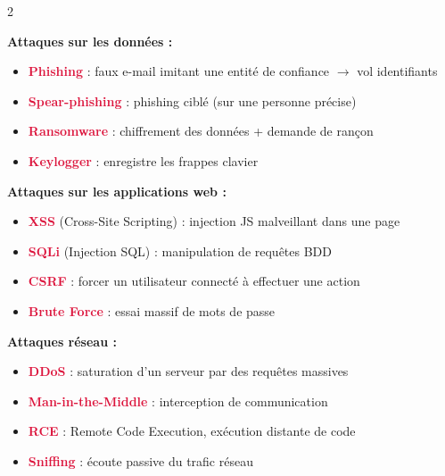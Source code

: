 \documentclass[a4paper,10pt]{article}
\newcommand{\warn}[1]{\textbf{\textcolor{crimson}{#1}}}
\begin{document}
\begin{multicols}{2}
\begin{tcolorbox}[basebox, colframe=crimson, title=2. Menaces et attaques]
\textbf{Attaques sur les données :}
\begin{itemize}
  \item \warn{Phishing} : faux e-mail imitant une entité de confiance $\to$ vol identifiants
  \item \warn{Spear-phishing} : phishing ciblé (sur une personne précise)
  \item \warn{Ransomware} : chiffrement des données + demande de rançon
  \item \warn{Keylogger} : enregistre les frappes clavier
\end{itemize}
\vspace{4pt}
\textbf{Attaques sur les applications web :}
\begin{itemize}
  \item \warn{XSS} (Cross-Site Scripting) : injection JS malveillant dans une page
  \item \warn{SQLi} (Injection SQL) : manipulation de requêtes BDD
  \item \warn{CSRF} : forcer un utilisateur connecté à effectuer une action
  \item \warn{Brute Force} : essai massif de mots de passe
\end{itemize}
\vspace{4pt}
\textbf{Attaques réseau :}
\begin{itemize}
  \item \warn{DDoS} : saturation d'un serveur par des requêtes massives
  \item \warn{Man-in-the-Middle} : interception de communication
  \item \warn{RCE} : Remote Code Execution, exécution distante de code
  \item \warn{Sniffing} : écoute passive du trafic réseau
\end{itemize}
\end{tcolorbox}


\end{multicols}
\end{document}
